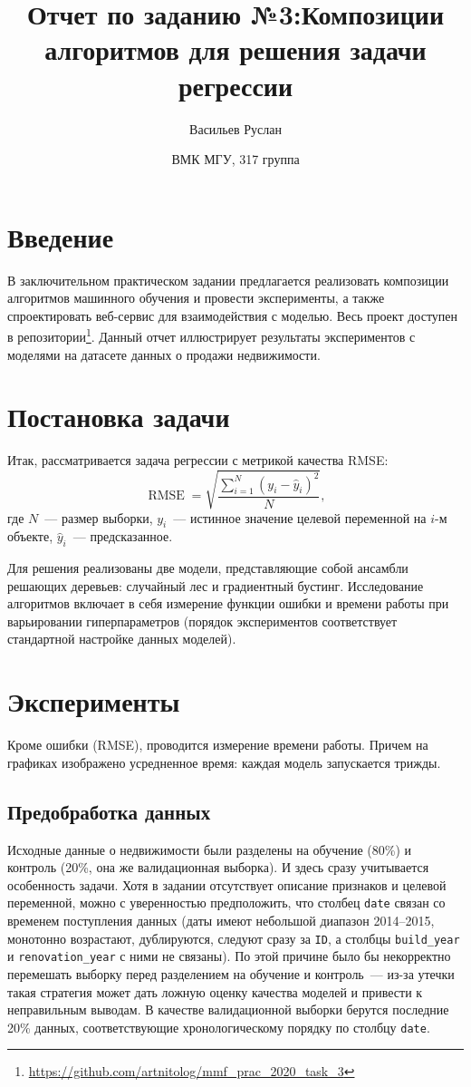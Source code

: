 \documentclass[12pt]{article}
\title{Отчет по заданию №3:\break Композиции алгоритмов для решения \break задачи регрессии}
\author{Васильев Руслан \and{ВМК МГУ, 317 группа}}
\begin{document}
\maketitle
\tableofcontents
\newpage
\section{Введение}
В заключительном практическом задании предлагается реализовать композиции алгоритмов машинного обучения и провести эксперименты, а также спроектировать веб-сервис для взаимодействия с моделью. Весь проект доступен в репозитории\footnote{\url{https://github.com/artnitolog/mmf_prac_2020_task_3}}. Данный отчет иллюстрирует результаты экспериментов с моделями на датасете данных о продажи недвижимости.

\section{Постановка задачи}

Итак, рассматривается задача регрессии с метрикой качества RMSE:
\begin{equation*}
    \operatorname{RMSE} = \sqrt{\frac{\sum_{i=1}^{N} (y_i - \hat{y}_i)^2}{N}},
\end{equation*}
где $N$~--- размер выборки, $y_i$~--- истинное значение целевой переменной на $i$-м объекте, $\hat{y}_i$~--- предсказанное.

Для решения реализованы две модели, представляющие собой ансамбли решающих деревьев: случайный лес и градиентный бустинг. Исследование алгоритмов включает в себя измерение функции ошибки и времени работы при варьировании гиперпараметров (порядок экспериментов соответствует стандартной настройке данных моделей).

\section{Эксперименты}
Кроме ошибки (RMSE), проводится измерение времени работы. Причем на графиках изображено усредненное время: каждая модель запускается трижды.

\subsection{Предобработка данных}
Исходные данные о недвижимости были разделены на обучение (80\%) и контроль (20\%, она же валидационная выборка). И здесь сразу учитывается особенность задачи. Хотя в задании отсутствует описание признаков и целевой переменной, можно с уверенностью предположить, что столбец \verb|date| связан со временем поступления данных (даты имеют небольшой диапазон 2014--2015, монотонно возрастают, дублируются, следуют сразу за \verb|ID|, а столбцы \verb|build_year| и \verb|renovation_year| с ними не связаны). По этой причине было бы некорректно перемешать выборку перед разделением на обучение и контроль~--- из-за утечки такая стратегия может дать ложную оценку качества моделей и привести к неправильным выводам. В качестве валидационной выборки берутся последние 20\% данных, соответствующие хронологическому порядку по столбцу \verb|date|.
\end{document}
